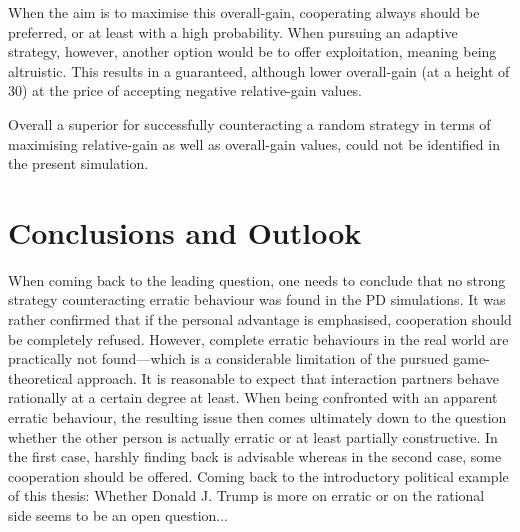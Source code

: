 \documentclass[11pt]{article}
\begin{document}
	When the aim is to maximise this overall-gain, cooperating always should be preferred, or at least with a high probability.
	When pursuing an adaptive strategy, however, another option would be to offer exploitation, meaning being altruistic.
	This results in a guaranteed, although lower overall-gain (at a height of 30) at the price of accepting negative relative-gain values.

	Overall a superior for successfully counteracting a random strategy in terms of maximising relative-gain as well as overall-gain values, could not be identified in the present simulation.


\section{Conclusions and Outlook} \label{sec:conclusion}
	
	When coming back to the leading question, one needs to conclude that no strong strategy counteracting erratic behaviour was found in the PD simulations.
	It was rather confirmed that if the personal advantage is emphasised, cooperation should be completely refused.
	However, complete erratic behaviours in the real world are practically not found---which is a considerable limitation of the pursued game-theoretical approach.
	It is reasonable to expect that interaction partners behave rationally at a certain degree at least. 
	When being confronted with an apparent erratic behaviour, the resulting issue then comes ultimately down to the question whether the other person is actually erratic or at least partially constructive.
	In the first case, harshly finding back is advisable whereas in the second case, some cooperation should be offered. 
	Coming back to the introductory political example of this thesis: Whether Donald J. Trump is more on erratic or on the rational side seems to be an open question...
\end{document}
